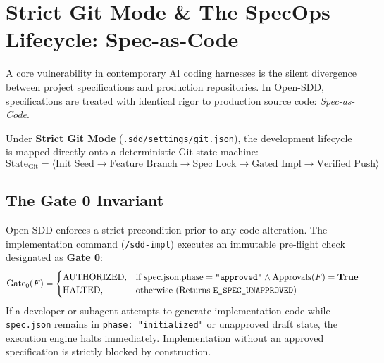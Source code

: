 \documentclass[11pt,a4paper]{article}
\begin{document}
\section{Strict Git Mode \& The SpecOps Lifecycle: Spec-as-Code}

A core vulnerability in contemporary AI coding harnesses is the silent divergence between project specifications and production repositories. In Open-SDD, specifications are treated with identical rigor to production source code: \textit{Spec-as-Code}.

Under \textbf{Strict Git Mode} (\texttt{.sdd/settings/git.json}), the development lifecycle is mapped directly onto a deterministic Git state machine:
\begin{equation}
    \text{State}_{\text{Git}} = \langle \text{Init Seed} \longrightarrow \text{Feature Branch} \longrightarrow \text{Spec Lock} \longrightarrow \text{Gated Impl} \longrightarrow \text{Verified Push} \rangle
\end{equation}

\subsection{The Gate 0 Invariant}
Open-SDD enforces a strict precondition prior to any code alteration. The implementation command (\texttt{/sdd-impl}) executes an immutable pre-flight check designated as \textbf{Gate 0}:
\begin{equation}
    \text{Gate}_0(F) = 
    \begin{cases} 
        \text{AUTHORIZED}, & \text{if } \text{spec.json}.\text{phase} = \texttt{"approved"} \land \text{Approvals}(F) = \mathbf{True} \\
        \text{HALTED}, & \text{otherwise (Returns \texttt{E\_SPEC\_UNAPPROVED})}
    \end{cases}
\end{equation}
If a developer or subagent attempts to generate implementation code while \texttt{spec.json} remains in \texttt{phase: "initialized"} or unapproved draft state, the execution engine halts immediately. Implementation without an approved specification is strictly blocked by construction.
\end{document}
